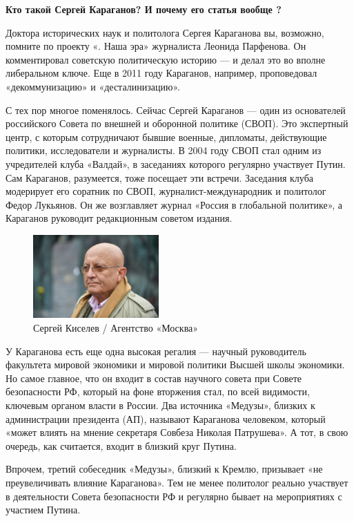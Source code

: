 \textbf{Кто такой Сергей Караганов? И почему его статья вообще ?}

Доктора исторических наук и политолога Сергея Караганова вы, возможно, помните по проекту «. Наша эра» журналиста Леонида Парфенова. Он комментировал советскую политическую историю — и делал это во вполне либеральном ключе. Еще в 2011 году Караганов, например, проповедовал «декоммунизацию» и «десталинизацию».

С тех пор многое поменялось. Сейчас Сергей Караганов --- один из основателей российского Совета по внешней и оборонной политике (СВОП). Это экспертный центр, с которым сотрудничают бывшие военные, дипломаты, действующие политики, исследователи и журналисты. В 2004 году СВОП стал одним из учредителей клуба «Валдай», в заседаниях которого регулярно участвует Путин. Сам Караганов, разумеется, тоже посещает эти встречи. Заседания клуба модерирует его соратник по СВОП, журналист-международник и политолог Федор Лукьянов. Он же возглавляет журнал «Россия в глобальной политике», а Караганов руководит редакционным советом издания.

\begin{figure}
    \centering
    \includegraphics[width=0.43\textwidth]{img/karaganov.png}
    \caption{Сергей Киселев / Агентство «Москва»}
\end{figure}
У Караганова есть еще одна высокая регалия --- научный руководитель факультета мировой экономики и мировой политики Высшей школы экономики. Но самое главное, что он входит в состав научного совета при Совете безопасности РФ, который на фоне вторжения стал, по всей видимости, ключевым органом власти в России. Два источника «Медузы», близких к администрации президента (АП), называют Караганова человеком, который «может влиять на мнение секретаря Совбеза Николая Патрушева». А тот, в свою очередь, как считается, входит в близкий круг Путина.

Впрочем, третий собеседник «Медузы», близкий к Кремлю, призывает «не преувеличивать влияние Караганова». Тем не менее политолог реально участвует в деятельности Совета безопасности РФ и регулярно бывает на мероприятиях с участием Путина.

